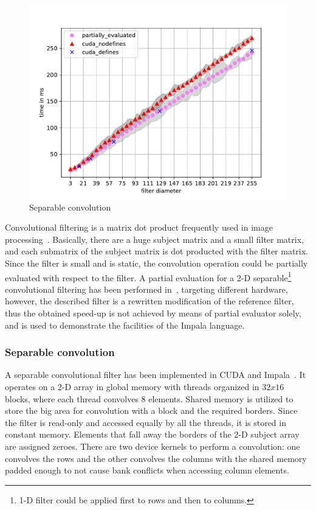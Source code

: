 \begin{figure}[h!]
    \centering
    \includegraphics[width=\linewidth]{figures/separable_convolution_diploma.pdf}
    \caption{Separable convolution}
    \label{fig:convolution}
\end{figure}

Convolutional filtering is a matrix dot product frequently used in image processing~\cite{chetlur2014cudnn}. Basically, there are a huge subject matrix and a small filter matrix, and each submatrix of the subject matrix is dot producted with the filter matrix.
Since the filter is small and is static, the convolution operation could be partially evaluated with respect to the filter.
A partial evaluation for a 2-D separable\footnote{1-D filter could be applied first to rows and then to columns.} convolutional filtering has been performed in~\cite{OnlinePe}, targeting different hardware, however, the described filter is a rewritten modification of the reference filter, thus the obtained speed-up is not achieved by means of partial evaluator solely, and is used to demonstrate the facilities of the Impala language.

\subsubsection{Separable convolution}

A separable convolutional filter has been implemented in CUDA and 
Impala~\cite{CudaConv}. It operates on a 2-D array in global memory with 
threads organized in $32 x 16$ blocks, where each thread convolves 8 elements. 
Shared memory is utilized to store the big area for convolution with a block 
and the required borders. Since the filter is read-only and accessed equally 
by all the threads, it is stored in constant memory. Elements that fall away 
the borders of the 2-D subject array are assigned zeroes. 
There are two device kernels to perform a convolution: one convolves the rows 
and the other convolves the columns with the shared memory padded enough to 
not cause bank conflicts when accessing column elements.

